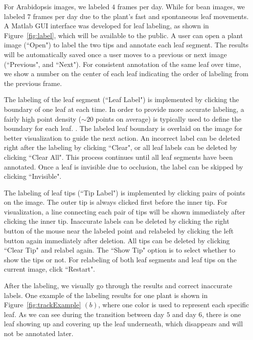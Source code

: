 For Arabidopsis images, we labeled $4$ frames per day.
While for bean images, we labeled $7$ frames per day due to the plant's fast and spontaneous leaf movements. 
A Matlab GUI interface was developed for leaf labeling, as shown in Figure~\ref{fig:label}, which will be available to the public.
A user can open a plant image (``Open") to label the two tips and annotate each leaf segment.
The results will be automatically saved once a user moves to a previous or next image (``Previous", and ``Next").
For consistent annotation of the same leaf over time, we show a number on the center of each leaf indicating the order of labeling from the previous frame.

The labeling of the leaf segment (``Leaf Label") is implemented by clicking the boundary of one leaf at each time.
In order to provide more accurate labeling, a fairly high point density ($\sim20$ points on average) is typically used to define the boundary for each leaf. .
The labeled leaf boundary is overlaid on the image for better visualization to guide the next action.
An incorrect label can be deleted right after the labeling by clicking ``Clear", or all leaf labels can be deleted by clicking ``Clear All".
This process continues until all leaf segments have been annotated.
Once a leaf is invisible due to occlusion, the label can be skipped by clicking ``Invisible".

The labeling of leaf tips (``Tip Label") is implemented by clicking pairs of points on the image.
The outer tip is always clicked first before the inner tip.
For visualization, a line connecting each pair of tips will be shown immediately after clicking the inner tip.
Inaccurate labels can be deleted by clicking the right button of the mouse near the labeled point and relabeled by clicking the left button again immediately after deletion.
All tips can be deleted by clicking ``Clear Tip" and relabel again.
The ``Show Tip" option is to select whether to show the tips or not.
For relabeling of both leaf segments and leaf tips on the current image, click ``Restart".

After the labeling, we visually go through the results and correct inaccurate labels.
One example of the labeling results for one plant is shown in Figure~\ref{fig:trackExample} $(b)$, where one color is used to represent each specific leaf.
As we can see during the transition between day $5$ and day $6$, there is one leaf showing up and covering up the leaf underneath, which disappears and will not be annotated later.

